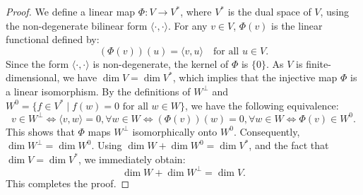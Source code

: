 \documentclass[../main.tex]{subfiles}
\begin{document}
\begin{proof}
    We define a linear map $\Phi: V \to V^*$, where $V^*$ is the dual space of $V$, using the non-degenerate bilinear form $\langle \cdot, \cdot \rangle$. For any $v \in V$, $\Phi(v)$ is the linear functional defined by:
$$(\Phi(v))(u) = \langle v, u \rangle \quad \text{for all } u \in V.$$
Since the form $\langle \cdot, \cdot \rangle$ is non-degenerate, the kernel of $\Phi$ is $\{0\}$. As $V$ is finite-dimensional, we have $\dim V = \dim V^*$, which implies that the injective map $\Phi$ is a linear isomorphism.
By the definitions of $W^{\perp}$ and $W^0 = \{f \in V^* \mid f(w) = 0 \text{ for all } w \in W\}$, we have the following equivalence:
$$v \in W^{\perp} \iff \langle v, w \rangle = 0, \forall w \in W \iff (\Phi(v))(w) = 0, \forall w \in W \iff \Phi(v) \in W^0.$$
This shows that $\Phi$ maps $W^{\perp}$ isomorphically onto $W^0$. Consequently, $\dim W^{\perp} = \dim W^0$.
Using  $\dim W + \dim W^0 = \dim V^*$, and the fact that $\dim V = \dim V^*$, we immediately obtain:
$$\dim W + \dim W^{\perp} = \dim V.$$
This completes the proof.
\end{proof}
\end{document}
